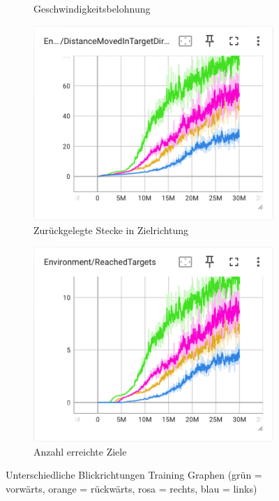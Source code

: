 \begin{figure}[H]
\begin{subfigure}{.49\textwidth}
      \caption{Geschwindigkeitsbelohnung}
      \label{fig:116_130_131_132_vel_reward}
    \end{subfigure}
    \begin{subfigure}{.49\textwidth}
      \centering  
      \includegraphics[width=\textwidth]{img/116_130_131_132_move_target_dir}
      \caption{Zurückgelegte Stecke in Zielrichtung}
      \label{fig:116_130_131_132_move_target_dir}
    \end{subfigure}
    \begin{subfigure}{.49\textwidth}
      \centering  
      \includegraphics[width=\textwidth]{img/116_130_131_132_reach_target}
      \caption{Anzahl erreichte Ziele}
      \label{fig:116_130_131_132_reach_target}
    \end{subfigure}
  \caption{Unterschiedliche Blickrichtungen Training Graphen (grün = vorwärts, orange = rückwärts, rosa = rechts, blau = links)}
  \label{fig:training_unterschiedliche_blickrichtung}
\end{figure}